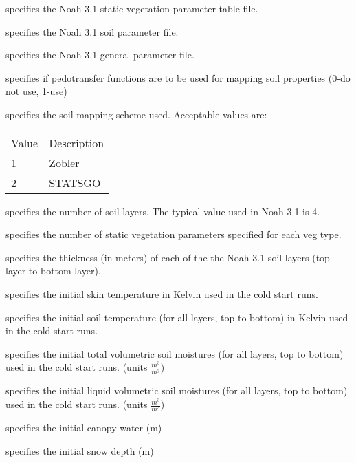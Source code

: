   specifies the Noah 3.1
 static vegetation parameter table file.

  specifies the Noah 3.1 soil
 parameter file.

  specifies the Noah 3.1 general
 parameter file.

  specifies if
 pedotransfer functions are to be used for mapping soil properties
 (0-do not use, 1-use)

  specifies the soil mapping scheme used. 
 Acceptable values are:

 \begin{tabular}{ll}
 Value & Description   \\
  1 & Zobler           \\
  2 & STATSGO          \\
 \end{tabular}

  specifies the number of soil 
 layers. The typical value used in Noah 3.1 is 4.

 specifies the number of static vegetation 
 parameters specified for each veg type.

  specifies the thickness (in meters)
 of each of the the Noah 3.1 soil layers (top layer to bottom layer).

 specifies the initial skin temperature in Kelvin used in the
 cold start runs.

 specifies the initial soil temperature (for all layers, top to bottom)
 in Kelvin used in the cold start runs.

  specifies the initial
 total volumetric soil moistures (for all layers, top to bottom)
 used in the cold start runs. (units $\frac{m^3}{m^3}$)

  specifies the initial
 liquid volumetric soil moistures (for all layers, top to bottom)
 used in the cold start runs. (units $\frac{m^3}{m^3}$)

  specifies the initial canopy
 water (m)

  specifies the initial snow depth (m)

